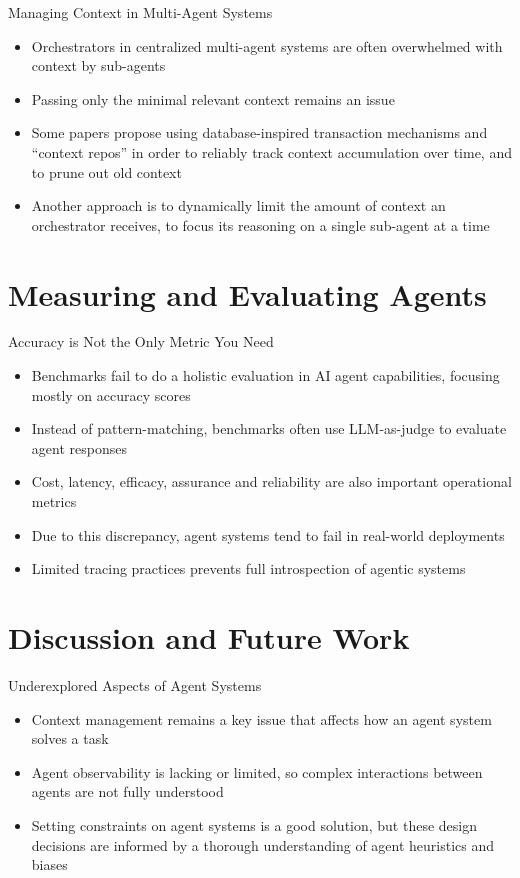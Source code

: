\documentclass[10pt]{beamer}
\begin{document}
\begin{frame}{Managing Context in Multi-Agent Systems}
	\begin{itemize}
		\item Orchestrators in centralized multi-agent systems are often overwhelmed with context by
			sub-agents
		\item Passing only the minimal relevant context remains an issue
		\item Some papers propose using database-inspired transaction mechanisms and ``context repos''
			in order to reliably track context accumulation over time, and to prune out old context
		\item Another approach is to dynamically limit the amount of context an orchestrator
			receives, to focus its reasoning on a single sub-agent at a time
	\end{itemize}
\end{frame}

\section{Measuring and Evaluating Agents}

\begin{frame}{Accuracy is Not the Only Metric You Need}
	\begin{itemize}
		\item Benchmarks fail to do a holistic evaluation in AI agent capabilities, focusing mostly
			on accuracy scores
		\item Instead of pattern-matching, benchmarks often use LLM-as-judge to evaluate agent
			responses
		\item Cost, latency, efficacy, assurance and reliability are also important operational
			metrics
		\item Due to this discrepancy, agent systems tend to fail in real-world deployments
		\item Limited tracing practices prevents full introspection of agentic systems
	\end{itemize}
\end{frame}

\section{Discussion and Future Work}

\begin{frame}{Underexplored Aspects of Agent Systems}
	\begin{itemize}
		\item Context management remains a key issue that affects how an agent system solves a task
		\item Agent observability is lacking or limited, so complex interactions between agents are
			not fully understood
		\item Setting constraints on agent systems is a good solution, but these design decisions
			are informed by a thorough understanding of agent heuristics and biases
	\end{itemize}
\end{frame}
\end{document}
